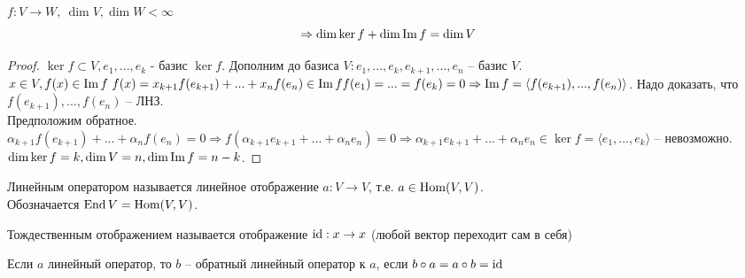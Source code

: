 \begin{Thm}
	$f: V \to W, \ \dim V, \dim W < \infty$ 
	$$ \Rightarrow \dim \ker f + \dim \operatorname{Im} f = \dim V$$
\end{Thm}

\begin{proof}
	$\ker f \subset V, e_1,...,e_k$ - базис $\ker f$. Дополним до базиса $V: e_1, ..., e_k, e_{k+1},..., e_n $ -- базис $V$. \\
	$x \in V, f(x)\in \operatorname{Im} f \ f(x) = x_{k+1} f(e_{k+1}) + ... + x_n f(e_n)  \in \operatorname{Im} f \\
	f(e_1) = ... = f(e_k) = 0 \Rightarrow \operatorname{Im} f = \langle f(e_{k+1}), ..., f(e_n) \rangle $. Надо доказать, что $f(e_{k+1}), ..., f(e_n)$ -- ЛНЗ. \\
	Предположим обратное. $\alpha_{k+1} f(e_{k+1}) + ... + \alpha_n  f(e_n) = 0 \Rightarrow f(\alpha_{k+1}e_{k+1} + ... + \alpha_n e_n) = 0 \Rightarrow\alpha_{k+1} e_{k+1} + ... + \alpha_n e_n \in \ker f = \langle e_1, ..., e_k\rangle$ -- невозможно.\\
	$\dim \ker f = k,\dim V = n, \dim \operatorname{Im} f = n - k$.
\end{proof}


\begin{Def}
	Линейным оператором называется линейное отображение $a: V \to V$, т.е. $a \in \operatorname{Hom}(V, V)$. \\
	Обозначается $\operatorname{End} V = \operatorname{Hom}(V, V)$.
\end{Def}

\begin{Def}
	Тождественным отображением называется отображение $\operatorname{id}: x \to x$ (любой вектор переходит сам в себя)
\end{Def}

\begin{Def}
	Если $a$ линейный оператор, то $b$ -- обратный линейный оператор к $a$, если $b \circ a = a \circ b = \operatorname{id}$
\end{Def}

